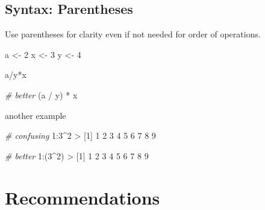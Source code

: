 \documentclass[
]{book}
\newenvironment{Shaded}{\begin{snugshade}}{\end{snugshade}}
\newcommand{\CommentTok}[1]{\textcolor[rgb]{0.56,0.35,0.01}{\textit{#1}}}
\newcommand{\DecValTok}[1]{\textcolor[rgb]{0.00,0.00,0.81}{#1}}
\newcommand{\NormalTok}[1]{#1}
\newcommand{\OtherTok}[1]{\textcolor[rgb]{0.56,0.35,0.01}{#1}}
\newcommand{\SpecialCharTok}[1]{\textcolor[rgb]{0.00,0.00,0.00}{#1}}
\begin{document}
\hypertarget{syntax-parentheses}{%
\subsection{Syntax: Parentheses}\label{syntax-parentheses}}

Use parentheses for clarity even if not needed for order of operations.

\begin{Shaded}
\begin{Highlighting}[]
\NormalTok{a }\OtherTok{\textless{}{-}} \DecValTok{2}
\NormalTok{x }\OtherTok{\textless{}{-}} \DecValTok{3}
\NormalTok{y }\OtherTok{\textless{}{-}} \DecValTok{4}

\NormalTok{a}\SpecialCharTok{/}\NormalTok{y}\SpecialCharTok{*}\NormalTok{x}

\CommentTok{\# better}
\NormalTok{(a }\SpecialCharTok{/}\NormalTok{ y) }\SpecialCharTok{*}\NormalTok{ x}
\end{Highlighting}
\end{Shaded}

another example

\begin{Shaded}
\begin{Highlighting}[]
\CommentTok{\# confusing}
\DecValTok{1}\SpecialCharTok{:}\DecValTok{3}\SpecialCharTok{\^{}}\DecValTok{2}
\SpecialCharTok{\textgreater{}}\NormalTok{ [}\DecValTok{1}\NormalTok{] }\DecValTok{1} \DecValTok{2} \DecValTok{3} \DecValTok{4} \DecValTok{5} \DecValTok{6} \DecValTok{7} \DecValTok{8} \DecValTok{9}

\CommentTok{\# better}
\DecValTok{1}\SpecialCharTok{:}\NormalTok{(}\DecValTok{3}\SpecialCharTok{\^{}}\DecValTok{2}\NormalTok{)}
\SpecialCharTok{\textgreater{}}\NormalTok{ [}\DecValTok{1}\NormalTok{] }\DecValTok{1} \DecValTok{2} \DecValTok{3} \DecValTok{4} \DecValTok{5} \DecValTok{6} \DecValTok{7} \DecValTok{8} \DecValTok{9}
\end{Highlighting}
\end{Shaded}

\hypertarget{recommendations}{%
\section{Recommendations}\label{recommendations}}
\end{document}
